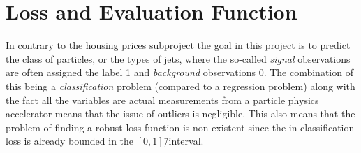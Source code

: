 

\FloatBarrier
\section{Loss and Evaluation Function}
\label{sec:q:loss_evaluation_function}

In contrary to the housing prices subproject the goal in this project is to predict the class of particles, or the types of jets, where the so-called \emph{signal} observations are often assigned the label \num{1} and \emph{background} observations \num{0}.  
The combination of this being a \emph{classification} problem (compared to a regression problem) along with the fact all the variables are actual measurements from a particle physics accelerator means that the issue of outliers is negligible. This also means that the problem of finding a robust loss function is non-existent since the in classification loss is already bounded in the $[0, 1]$\=/interval. 

